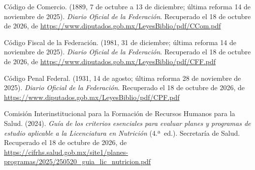 \documentclass[12pt, a4paper]{article}
\begin{document}
\begin{list}{}{\setlength{\leftmargin}{1.27cm}\setlength{\itemindent}{-1.27cm}%
  \setlength{\labelwidth}{0pt}\setlength{\labelsep}{0pt}\setlength{\itemsep}{6pt}}
 
\item Código de Comercio. (1889, 7 de octubre a 13 de diciembre;
  última reforma 14 de noviembre de 2025). \textit{Diario Oficial de
  la Federación}. Recuperado el 18 de octubre de 2026, de \url{https://www.diputados.gob.mx/LeyesBiblio/pdf/CCom.pdf}
 
 
\item Código Fiscal de la Federación. (1981, 31 de diciembre;
   última reforma 14 de noviembre de 2025). \textit{Diario Oficial de la
Federación}. Recuperado el 18 de octubre de 2026, de \url{https://www.diputados.gob.mx/LeyesBiblio/pdf/CFF.pdf}
 
 
\item Código Penal Federal. (1931, 14 de agosto; última reforma
  28 de noviembre de 2025). \textit{Diario Oficial de la Federación}. Recuperado el 18 de octubre de 2026, de \url{https://www.diputados.gob.mx/LeyesBiblio/pdf/CPF.pdf}

 
\item Comisión Interinstitucional para la Formación de Recursos Humanos
  para la Salud. (2024). \textit{Guía de los criterios esenciales para
  evaluar planes y programas de estudio aplicable a la Licenciatura en
  Nutrición} (4.ª~ed.). Secretaría de Salud.
  Recuperado el 18 de octubre de 2026, de \url{https://cifrhs.salud.gob.mx/site1/planes-programas/2025/250520_guia_lic_nutricion.pdf}
 

\end{list}
\end{document}
